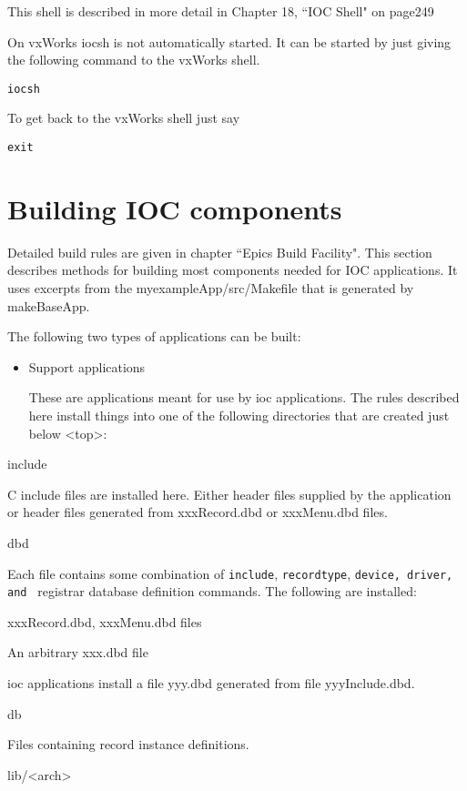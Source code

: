 This shell is described in more detail in Chapter 18, ``IOC Shell" on page249

On vxWorks iocsh is not automatically started. It can be started by just giving the following command to the vxWorks 
shell.

\begin{verbatim}iocsh
\end{verbatim}To get back to the vxWorks shell just say

\begin{verbatim}exit
\end{verbatim}\section{Building IOC components}

Detailed build rules are given in chapter ``Epics Build Facility". This section describes methods for building most 
components needed for IOC applications. It uses excerpts from the myexampleApp/src/Makefile that is generated by 
makeBaseApp.

The following two types of applications can be built:

\begin{itemize}\item Support applications

These are applications meant for use by ioc applications. The rules described here install things into one of the 
following directories that are created just below \textless{}top\textgreater{}:

\end{itemize}include

C include files are installed here. Either header files supplied by the application or header files generated 
from xxxRecord.dbd or xxxMenu.dbd files.

dbd

Each file contains some combination of \verb|include|, \verb|recordtype|, \verb|device, driver, and |
registrar database definition commands. The following are installed:

 xxxRecord.dbd, xxxMenu.dbd files

An arbitrary xxx.dbd file

 ioc applications install a file yyy.dbd generated from file yyyInclude.dbd.

db

Files containing record instance definitions. 

lib/\textless{}arch\textgreater{}

